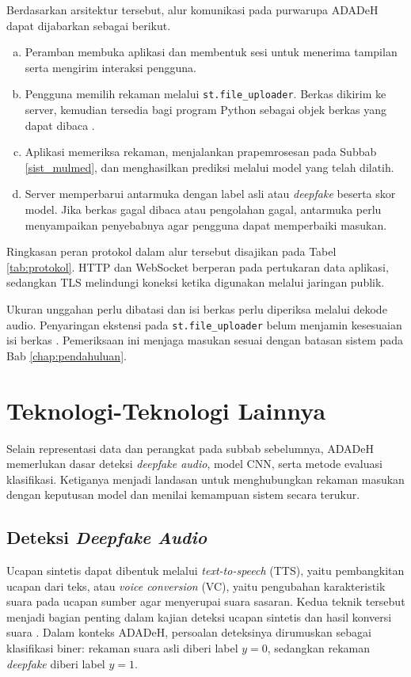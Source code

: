 Berdasarkan arsitektur tersebut, alur komunikasi pada purwarupa ADADeH dapat dijabarkan sebagai berikut.
\begin{enumerate}[(a).]
  \item Peramban membuka aplikasi dan membentuk sesi untuk menerima tampilan serta mengirim interaksi pengguna.
  \item Pengguna memilih rekaman melalui \texttt{st.file\_uploader}. Berkas dikirim ke server, kemudian tersedia bagi program Python sebagai objek berkas yang dapat dibaca \autocite{streamlit2026uploader}.
  \item Aplikasi memeriksa rekaman, menjalankan prapemrosesan pada Subbab \ref{sist_mulmed}, dan menghasilkan prediksi melalui model yang telah dilatih.
  \item Server memperbarui antarmuka dengan label asli atau \textit{deepfake} beserta skor model. Jika berkas gagal dibaca atau pengolahan gagal, antarmuka perlu menyampaikan penyebabnya agar pengguna dapat memperbaiki masukan.
\end{enumerate}

Ringkasan peran protokol dalam alur tersebut disajikan pada Tabel \ref{tab:protokol}. HTTP dan WebSocket berperan pada pertukaran data aplikasi, sedangkan TLS melindungi koneksi ketika digunakan melalui jaringan publik.

Ukuran unggahan perlu dibatasi dan isi berkas perlu diperiksa melalui dekode audio. Penyaringan ekstensi pada \texttt{st.file\_uploader} belum menjamin kesesuaian isi berkas \autocite{streamlit2026uploader}. Pemeriksaan ini menjaga masukan sesuai dengan batasan sistem pada Bab \ref{chap:pendahuluan}.

\section{Teknologi-Teknologi Lainnya}
\label{other_tech}

Selain representasi data dan perangkat pada subbab sebelumnya, ADADeH memerlukan dasar deteksi \textit{deepfake audio}, model CNN, serta metode evaluasi klasifikasi. Ketiganya menjadi landasan untuk menghubungkan rekaman masukan dengan keputusan model dan menilai kemampuan sistem secara terukur.

\subsection{Deteksi \textit{Deepfake Audio}}
\label{deteksi_deepfake}

Ucapan sintetis dapat dibentuk melalui \textit{text-to-speech} (TTS), yaitu pembangkitan ucapan dari teks, atau \textit{voice conversion} (VC), yaitu pengubahan karakteristik suara pada ucapan sumber agar menyerupai suara sasaran. Kedua teknik tersebut menjadi bagian penting dalam kajian deteksi ucapan sintetis dan hasil konversi suara \autocite{wang2019asvspoof}. Dalam konteks ADADeH, persoalan deteksinya dirumuskan sebagai klasifikasi biner: rekaman suara asli diberi label $y = 0$, sedangkan rekaman \textit{deepfake} diberi label $y = 1$.

